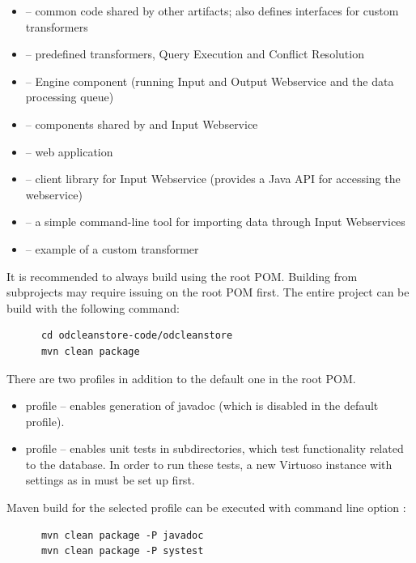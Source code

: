 \begin{itemize}
	\item {} -- common code shared by other artifacts; also defines interfaces for custom transformers
	\item {} -- predefined transformers, Query Execution and Conflict Resolution
	\item {} -- Engine component (running Input and Output Webservice and the data processing queue)
	\item {} -- components shared by  and Input Webservice
	\item {} -- \FE web application
	\item {} -- client library for Input Webservice (provides a Java API for accessing the webservice)
	\item {} -- a simple command-line tool for importing data through Input Webservices
	\item {} -- example of a custom transformer
\end{itemize}


It is recommended to always build using the root POM. Building from subprojects may require issuing  on the root POM first. The entire project can be build with the following command:

\begin{verbatim}
      cd odcleanstore-code/odcleanstore
      mvn clean package
\end{verbatim}

There are two profiles in addition to the default one in the root POM.

\begin{itemize}
	\item {} profile -- enables generation of javadoc (which is disabled in the default profile). 
	\item {} profile -- enables unit tests in  subdirectories, which test functionality related to the database. In order to run these tests, a new Virtuoso instance with settings as in  must be set up first.
\end{itemize}

Maven build for the selected profile can be executed with command line option :

\begin{verbatim}
      mvn clean package -P javadoc
      mvn clean package -P systest	
\end{verbatim}

